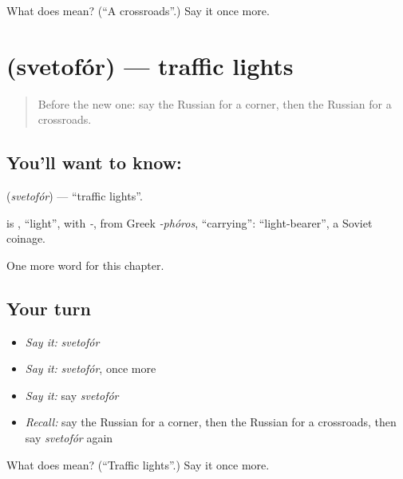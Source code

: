 \begin{tcolorbox}[breakable,colback=teal!4,colframe=teal!35!black,title={Before you move on}]
What does  mean? (\textquotedblleft{}A crossroads\textquotedblright{}.) Say it once more.
\end{tcolorbox}
\section[\texorpdfstring{\ru{светофор} (svetofór)}{светофор (svetofór)}]{ (svetofór) — traffic lights}

\label{lesson:RU-C89-traffic-lights}



\begin{quote}
Before the new one: say the Russian for a corner, then the Russian for a crossroads.
\end{quote}

\subsection*{You'll want to know: }
\textbf{} (\emph{svetofór}) — \textquotedblleft{}traffic lights\textquotedblright{}.

\begin{cousinweb}
\textbf{} is \emph{}, \textquotedblleft{}light\textquotedblright{}, with \emph{-}, from Greek \emph{-phóros}, \textquotedblleft{}carrying\textquotedblright{}: \textquotedblleft{}light-bearer\textquotedblright{}, a Soviet coinage.
\end{cousinweb}

\begin{grammarlens}[title={What you've built}]
One more word for this chapter.
\end{grammarlens}

\subsection*{Your turn}
\begin{itemize}
\raggedright
  \item \emph{Say it:} \emph{svetofór}
  \item \emph{Say it:} \emph{svetofór}, once more
  \item \emph{Say it:} say \emph{svetofór}
  \item \emph{Recall:} say the Russian for a corner, then the Russian for a crossroads, then say \emph{svetofór} again
\end{itemize}

\begin{tcolorbox}[breakable,colback=teal!4,colframe=teal!35!black,title={Before you move on}]
What does  mean? (\textquotedblleft{}Traffic lights\textquotedblright{}.) Say it once more.
\end{tcolorbox}
